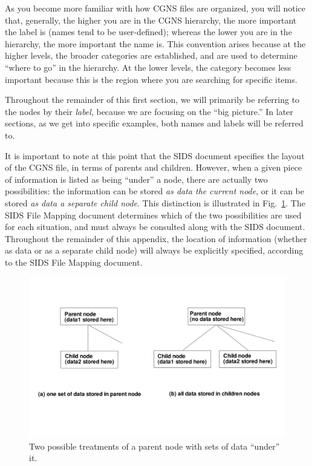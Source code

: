 \documentclass[12pt]{article}
\begin{document}
As you become more familiar with how CGNS files are
organized, you will notice that,
generally, the higher you are in the CGNS hierarchy, the more
important the label is (names tend to be user-defined); whereas
the lower you are in the hierarchy, the more important the
name is.  This convention arises because at the higher levels,
the broader categories are established, and are used to determine
``where to go'' in the hierarchy.   At the lower levels, the category becomes
less important because this is the region where you are
searching for specific items.

Throughout the remainder of this
first section, we will primarily be referring to the nodes by their
{\it label}, because we are focusing on the ``big picture.''
In later sections, as we get into specific examples,
both names and labels will be referred to.

It is important to note at this point that the SIDS document
specifies the layout of the CGNS file, in terms of parents
and children.  However, when a given piece of information is
listed as being ``under'' a node, there are actually two possibilities:
the information can be stored {\it as data  the current node},
or it can be stored {\it as data  a separate child node}.
This distinction is illustrated in Fig.~\ref{FIGdataorchild}.  
The SIDS File Mapping document \cite{CGNS2} determines which of the two
possibilities are used for each situation, and must always be
consulted along with the SIDS document. Throughout the remainder
of this appendix, the location of information (whether
as data or as a separate child node) will always be explicitly
specified, according to the SIDS File Mapping document.

\begin{figure}[hpbt]
\centerline{{\includegraphics[width=150mm]{figures/dataorchild}}}
\caption{Two possible treatments of a parent node with sets
of data ``under'' it.}
\label{FIGdataorchild}
\end{figure}
%
\end{document}
